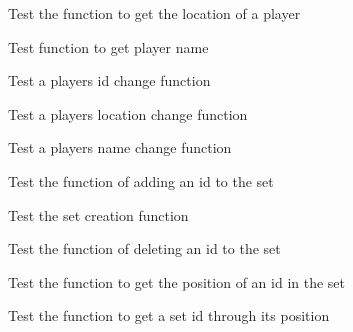 \begin{DoxyRefList}
\item[\label{test__test000131}%
\Hypertarget{test__test000131}%
Global \hyperlink{player__test_8c_a4c5605fac4bd716e1dfb2744db4fa8a1}{test2\+\_\+player\+\_\+get\+\_\+location} ()]Test the function to get the location of a player  
\item[\label{test__test000127}%
\Hypertarget{test__test000127}%
Global \hyperlink{player__test_8c_a3aa908fd360b74e7786422260e8e16a0}{test2\+\_\+player\+\_\+get\+\_\+name} ()]Test function to get player name  
\item[\label{test__test000133}%
\Hypertarget{test__test000133}%
Global \hyperlink{player__test_8c_a3695e0896bc3d770290e6a691fa212f7}{test2\+\_\+player\+\_\+set\+\_\+id} ()]Test a player\textquotesingle{}s id change function  
\item[\label{test__test000129}%
\Hypertarget{test__test000129}%
Global \hyperlink{player__test_8c_a2c702753d9e2e3df9ef4abf2d1b9bc8d}{test2\+\_\+player\+\_\+set\+\_\+location} ()]Test a player\textquotesingle{}s location change function  
\item[\label{test__test000125}%
\Hypertarget{test__test000125}%
Global \hyperlink{player__test_8c_a6e7ce8ff791f4bf63749df647a44263f}{test2\+\_\+player\+\_\+set\+\_\+name} ()]Test a player\textquotesingle{}s name change function  
\item[\label{test__test000141}%
\Hypertarget{test__test000141}%
Global \hyperlink{set__test_8c_ab09827322a313bf97b9757c98c2bdbb0}{test2\+\_\+set\+\_\+add} ()]Test the function of adding an id to the set  
\item[\label{test__test000139}%
\Hypertarget{test__test000139}%
Global \hyperlink{set__test_8c_abed3d273788e23fc31ae7f5ed59277b9}{test2\+\_\+set\+\_\+create} ()]Test the set creation function  
\item[\label{test__test000143}%
\Hypertarget{test__test000143}%
Global \hyperlink{set__test_8c_a9fbb61e5eea38d7417eb5ef64eb766f2}{test2\+\_\+set\+\_\+dell} ()]Test the function of deleting an id to the set  
\item[\label{test__test000148}%
\Hypertarget{test__test000148}%
Global \hyperlink{set__test_8c_ab12db9af55352dff078faf323c25bbd8}{test2\+\_\+set\+\_\+find\+\_\+index} ()]Test the function to get the position of an id in the set  
\item[\label{test__test000150}%
\Hypertarget{test__test000150}%
Global \hyperlink{set__test_8c_a4151e3cdda9104e29200e4662be27313}{test2\+\_\+set\+\_\+get\+\_\+id\+\_\+at\+\_\+position} ()]Test the function to get a set id through its position  

\end{DoxyRefList}
